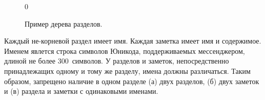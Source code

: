         \begin{figure}[h]
            \centering
            \begingroup
            \newlength{\treeindent}
            \newlength{\treeskip}
            \setlength{\treeindent}{2em}
            \setlength{\treeskip}{-3ex}
            \setcounter{treeline}0
            \newcommand{\mypoint}[2]{(#2 * \treeindent, #1 * \treeskip)}
            \newcommand{\outpoint}[2]{(#2 * \treeindent + 0.75em, #1 * \treeskip - 1.5ex)}
            \newcommand{\midpoint}[2]{(#2 * \treeindent + 0.75em, #1 * \treeskip)}
            \newcommand{\inpoint}[2]{(#2 * \treeindent - 0.1em, #1 * \treeskip)}
            \newcommand{\mynode}[2]{
                \node at \mypoint{\thetreeline}{#1} [anchor = west] {#2};%
                \stepcounter{treeline}%
            }
            \endgroup
            \caption{Пример дерева разделов.}
            \label{fig:req:fn:kb:tree}
        \end{figure}

        Каждый не-корневой раздел имеет имя. Каждая заметка имеет имя и содержимое.
        Именем явлется строка символов Юникода, поддерживаемых мессенджером, длиной
        не более 300~символов. У разделов и заметок, непосредственно принадлежащих одному и тому же
        разделу, имена должны различаться. Таким образом, запрещено наличие в одном разделе
        (а) двух разделов, (б) двух заметок и (в) раздела и заметки с одинаковыми именами.

